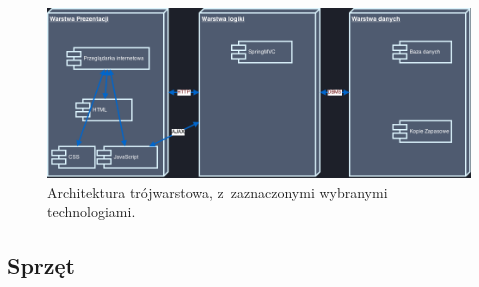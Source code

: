 \begin{figure}[H]
  \includegraphics[width=\textwidth]{images/3tier.png}
  \caption{Architektura trójwarstowa, z~zaznaczonymi wybranymi technologiami.}
\end{figure}

\subsection{Sprzęt}

